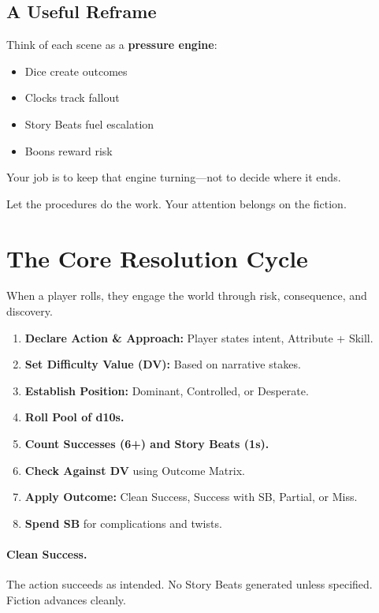 \subsection{A Useful Reframe}
\label{subsec:pressure-engine}
Think of each scene as a \textbf{pressure engine}:
\begin{itemize}
\item Dice create outcomes
\item Clocks track fallout
\item Story Beats fuel escalation
\item Boons reward risk
\end{itemize}
Your job is to keep that engine turning—not to decide where it ends.

Let the procedures do the work. Your attention belongs on the fiction.

\section{The Core Resolution Cycle}
\label{sec:core-resolution-cycle}

When a player rolls, they engage the world through risk, consequence, and discovery.

\begin{enumerate}
\item \textbf{Declare Action \& Approach:} Player states intent, Attribute + Skill.
\item \textbf{Set Difficulty Value (DV):} Based on narrative stakes.
\item \textbf{Establish Position:} Dominant, Controlled, or Desperate.
\item \textbf{Roll Pool of d10s.}
\item \textbf{Count Successes (6+) and Story Beats (1s).}
\item \textbf{Check Against DV} using Outcome Matrix.
\item \textbf{Apply Outcome:} Clean Success, Success with SB, Partial, or Miss.
\item \textbf{Spend SB} for complications and twists.
\end{enumerate}

\paragraph{Clean Success.}
The action succeeds as intended. No Story Beats generated unless specified. Fiction advances cleanly.

